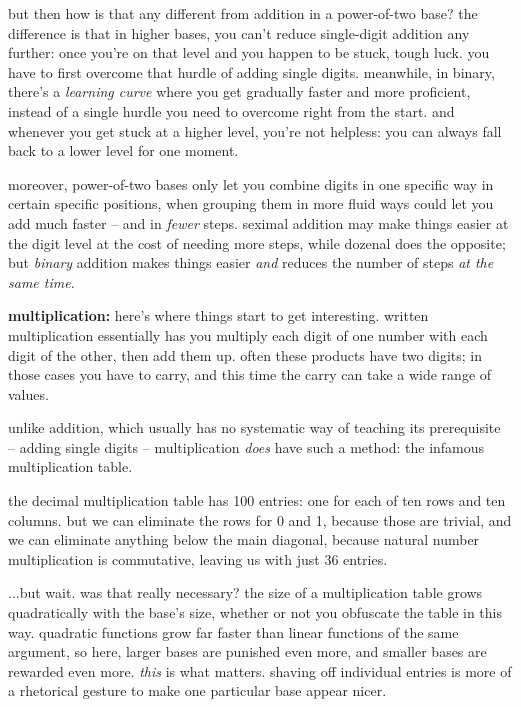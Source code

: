 \documentclass[../best.tex]{subfiles}
\begin{document}
but then how is that any different from addition in a power-of-two base? the difference is that in higher bases, you can't reduce single-digit addition any further: once you're on that level and you happen to be stuck, tough luck. you have to first overcome that hurdle of adding single digits. meanwhile, in binary, there's a \emph{learning curve} where you get gradually faster and more proficient, instead of a single hurdle you need to overcome right from the start. and whenever you get stuck at a higher level, you're not helpless: you can always fall back to a lower level for one moment.

moreover, power-of-two bases only let you combine digits in one specific way in certain specific positions, when grouping them in more fluid ways could let you add much faster -- and in \emph{fewer} steps. seximal addition may make things easier at the digit level at the cost of needing more steps, while dozenal does the opposite; but \emph{binary} addition makes things easier \emph{and} reduces the number of steps \emph{at the same time}.

{\bf multiplication:} here's where things start to get interesting. written multiplication essentially has you multiply each digit of one number with each digit of the other, then add them up. often these products have two digits; in those cases you have to carry, and this time the carry can take a wide range of values.\myfootnote{}

unlike addition, which usually has no systematic way of teaching its prerequisite -- adding single digits -- multiplication \emph{does} have such a method: the infamous multiplication table.

the decimal multiplication table has 100 entries: one for each of ten rows and ten columns. but we can eliminate the rows for 0 and 1, because those are trivial, and we can eliminate anything below the main diagonal, because natural number multiplication is commutative,\myfootnote{} leaving us with just 36 entries.

...but wait. was that really necessary? the size of a multiplication table grows quadratically with the base's size, whether or not you obfuscate the table in this way. quadratic functions grow far faster than linear functions of the same argument, so here, larger bases are punished even more, and smaller bases are rewarded even more. \emph{this} is what matters. shaving off individual entries is more of a rhetorical gesture to make one particular base appear nicer.\myfootnote{}
\end{document}
